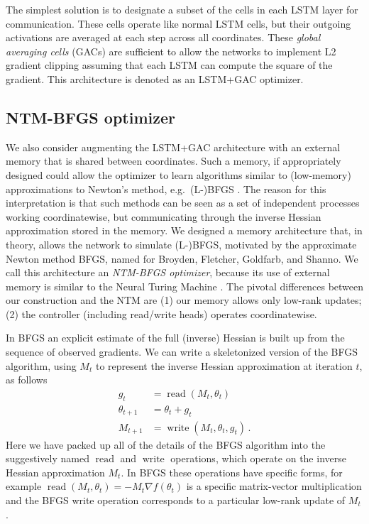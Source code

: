 \documentclass{article}
\begin{document}
The simplest solution is to designate a subset of the cells in each LSTM layer
for communication. These cells operate like normal LSTM cells, but their
outgoing activations are averaged at each step across all coordinates.  These
\emph{global averaging cells} (GACs) are sufficient to allow the networks to
implement L2 gradient clipping \citep{bengio:2013} assuming that each LSTM can
compute the square of the gradient. This architecture is denoted as an LSTM+GAC
optimizer.

\subsection*{NTM-BFGS optimizer}

We also consider augmenting the LSTM+GAC architecture with an external memory
that is shared between coordinates. Such a memory, if appropriately designed
could allow the optimizer to learn algorithms similar to (low-memory)
approximations to Newton's method, e.g.\ (L-)BFGS \citep[see][]{nocedal:2006}.
The reason for this interpretation is that such methods can be seen as a set of
independent processes working coordinatewise, but communicating through the
inverse Hessian approximation stored in the memory.  We designed a memory
architecture that, in theory, allows the network to simulate (L-)BFGS,
motivated by the approximate Newton method BFGS, named for Broyden, Fletcher,
Goldfarb, and Shanno.  We call this architecture an \emph{NTM-BFGS optimizer},
because its use of external memory is similar to the Neural Turing Machine
\citep{graves:2014}.  The pivotal differences between our construction and the
NTM are (1) our memory allows only low-rank updates; (2) the controller
(including read/write heads) operates coordinatewise.

In BFGS an explicit estimate of the full (inverse) Hessian is built up from the sequence of observed gradients.
We can write a skeletonized version of the BFGS algorithm, using $M_t$ to represent the inverse Hessian approximation at iteration $t$, as follows
\begin{align*}
g_t &= \operatorname{read}(M_t, \theta_t) \\
\theta_{t+1} &= \theta_{t} + g_t \\
M_{t+1} &= \operatorname{write}(M_t, \theta_t, g_t)
\,.
\end{align*}
Here we have packed up all of the details of the BFGS algorithm into the
suggestively named $\operatorname{read}$ and $\operatorname{write}$ operations,
which operate on the inverse Hessian approximation $M_t$.  In BFGS these
operations have specific forms, for example $\operatorname{read}(M_t, \theta_t)
= -M_t\nabla f(\theta_t)$ is a specific matrix-vector multiplication and
the BFGS write operation corresponds to a particular low-rank update of $M_t$.
\end{document}
